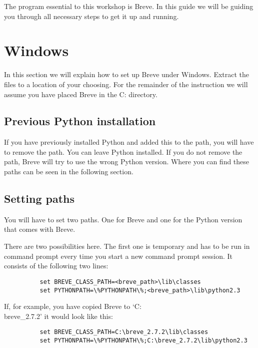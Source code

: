 
The program essential to this workshop is Breve. In this guide we will be guiding you through all necessary steps to get it up and running. 

\section{Windows}
	In this section we will explain how to set up Breve under Windows. Extract the files to a location of your choosing. For the remainder of the instruction we will assume you have placed Breve in the C: directory.

\subsection{Previous Python installation}
	If you have previously installed Python and added this to the path, you will have to remove the path. You can leave Python installed. If you do not remove the path, Breve will try to use the wrong Python version. Where you can find these paths can be seen in the following section.

\subsection{Setting paths}
	You will have to set two paths. One for Breve and one for the Python version that comes with Breve.

	There are two possibilities here. The first one is temporary and has to be run in command prompt every time you start a new command prompt session. It consists of the following two lines:
	\begin{verbatim}
		  set BREVE_CLASS_PATH=<breve_path>\lib\classes
		  set PYTHONPATH=\%PYTHONPATH\%;<breve_path>\lib\python2.3
	\end{verbatim}
	If, for example, you have copied Breve to `C:\\breve\_2.7.2' it would look like this:
	\begin{verbatim}
		  set BREVE_CLASS_PATH=C:\breve_2.7.2\lib\classes
		  set PYTHONPATH=\%PYTHONPATH\%;C:\breve_2.7.2\lib\python2.3
	\end{verbatim}


